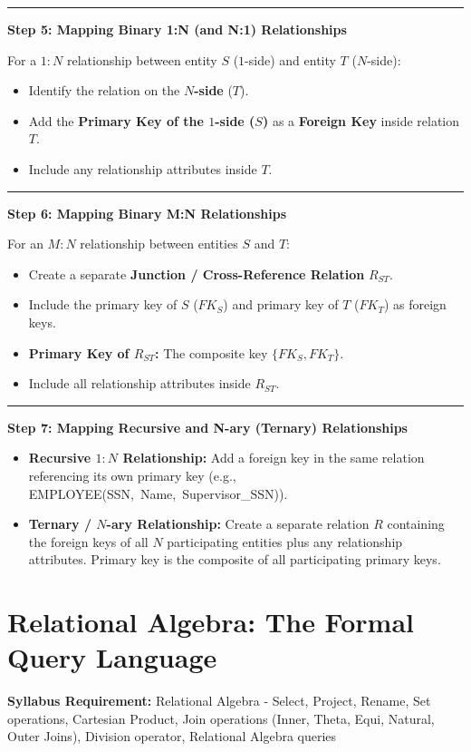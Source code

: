 \documentclass[11pt,a4paper]{article}
\newcommand{\ic}[1]{\mbox{\colorbox{AnthCodeBG}{\footnotesize\ttfamily\textcolor{AnthBlue}{#1}}}}
\newcommand{\concept}[1]{%
  \vspace{3pt}\noindent\textcolor{AnthGreen}{\rule{3.5pt}{10pt}}\enspace
  \textbf{\sffamily\color{AnthDark}#1}\par\vspace{2pt}%
}
\newcommand{\syllabusitem}[1]{%
  \begin{tcolorbox}[enhanced, colback=AnthOrange!8, colframe=AnthOrange, boxrule=0.4pt, arc=3pt, left=7pt, right=7pt, top=3pt, bottom=3pt]
    \small\sffamily\textbf{\color{AnthOrange}Syllabus Requirement:} #1
  \end{tcolorbox}
}
\newenvironment{Deriv}[1][Mapping Algorithm]{\begin{tcolorbox}[derivbox, title=#1]}{\end{tcolorbox}}
\begin{document}
\begin{Deriv}[The 7-Step ER-to-Relational Synthesis Algorithm]
\concept{Step 5: Mapping Binary 1:N (and N:1) Relationships}
For a $1:N$ relationship between entity $S$ ($1$-side) and entity $T$ ($N$-side):
\begin{itemize}
  \item Identify the relation on the \textbf{$N$-side} ($T$).
  \item Add the \textbf{Primary Key of the $1$-side ($S$)} as a \textbf{Foreign Key} inside relation $T$.
  \item Include any relationship attributes inside $T$.
\end{itemize}

\concept{Step 6: Mapping Binary M:N Relationships}
For an $M:N$ relationship between entities $S$ and $T$:
\begin{itemize}
  \item Create a separate \textbf{Junction / Cross-Reference Relation} $R_{ST}$.
  \item Include the primary key of $S$ ($FK_S$) and primary key of $T$ ($FK_T$) as foreign keys.
  \item \textbf{Primary Key of $R_{ST}$:} The composite key $\{ FK_S, FK_T \}$.
  \item Include all relationship attributes inside $R_{ST}$.
\end{itemize}

\concept{Step 7: Mapping Recursive and N-ary (Ternary) Relationships}
\begin{itemize}
  \item \textbf{Recursive $1:N$ Relationship:} Add a foreign key in the same relation referencing its own primary key (e.g., \ic{EMPLOYEE(SSN, Name, Supervisor\_SSN)}).
  \item \textbf{Ternary / $N$-ary Relationship:} Create a separate relation $R$ containing the foreign keys of all $N$ participating entities plus any relationship attributes. Primary key is the composite of all participating primary keys.
\end{itemize}
\end{Deriv}

\clearpage
\section{Relational Algebra: The Formal Query Language}

\syllabusitem{Relational Algebra - Select, Project, Rename, Set operations, Cartesian Product, Join operations (Inner, Theta, Equi, Natural, Outer Joins), Division operator, Relational Algebra queries}
\end{document}
